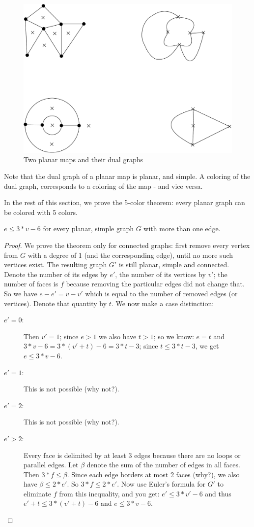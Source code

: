 \begin{figure}[ht]
\begin{center}
\includegraphics[width=0.6\linewidth,keepaspectratio]{dual1}
\end{center}
\caption{Two planar maps and their dual graphs\label{dual1}}
\end{figure}

Note that the dual graph of a planar map is planar, and simple. A
coloring of the dual graph, corresponds to a coloring of the map - and
vice versa.

In the rest of this section, we prove the 5-color theorem: every
planar graph can be colored with 5 colors.

 \begin{theorem} $e \leq 3*v-6$ for every planar, simple graph
     $G$ with more than one edge.\label{euler}
\end{theorem}
\begin{proof}
We prove the theorem only for connected graphs: first remove
every vertex from $G$ with a degree of 1 (and the corresponding edge),
until no more such vertices exist. The resulting graph $G'$ is still
planar, simple and connected. Denote the number of its edges by $e'$,
the number of its vertices by $v'$; the number of faces is $f$
because removing the particular edges did not change that. So we have
$e-e'=v-v'$ which is equal to the number of removed edges (or
vertices). Denote that quantity by $t$. We now make a case distinction:
\begin{description}
\item[\underline{$e'=0$}:]
Then $v' = 1$; since $e > 1$ we also have $t > 1$;
so we know: $e = t$ and $3*v-6 = 3*(v'+t) -6 = 3*t-3$; since $t \leq
3*t-3$, we get $e \leq 3*v-6$.

\item[\underline{$e'=1$}:]
This is not possible (why not?).
\item[\underline{$e'=2$}:]
This is not possible (why not?).

\item[\underline{$e' > 2$}:]
Every face is delimited by at least 3 edges because
there are no loops or parallel edges. Let $\beta$ denote the sum of
the number of edges in all faces. Then $3*f \leq \beta$. Since each
edge borders at most 2 faces (why?), we also have $\beta \leq 2*e'$. So
$3*f \leq 2*e'$. Now use Euler's formula for $G'$ to eliminate $f$
from this inequality, and you get: $e' \leq 3*v'-6$ and thus $e'+t
\leq 3*(v'+t)-6$ and $e \leq 3*v-6$.
\end{description}
\end{proof}

